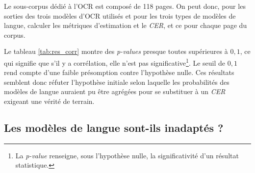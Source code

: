 \documentclass[10pt,twoside]{article}
\begin{document}
    Le sous-corpus dédié à l'OCR est composé de 118 pages.
    On peut donc, pour les sorties des trois modèles d'OCR utilisés et pour les trois types de modèles de langue, calculer 
    les métriques d'estimation et le \textit{CER}, et ce pour chaque page du corpus. 

    Le tableau \ref{tab:res_corr} montre des \textit{p-values} presque toutes supérieures à $0,1$, ce qui signifie que s'il y a
    corrélation, elle n'est pas significative\footnote{La \textit{p-value} renseigne, sous l'hypothèse nulle, la significativité d'un résultat
    statistique.}. Le seuil de $0,1$ rend compte d'une faible présomption contre l'hypothèse nulle. Ces résultats semblent donc réfuter l'hypothèse initiale 
    selon laquelle les probabilités 
    des modèles de langue auraient pu être agrégées pour se substituer à un \textit{CER} exigeant une vérité de terrain. 

    \subsection{Les modèles de langue sont-ils inadaptés ?}
\end{document}
